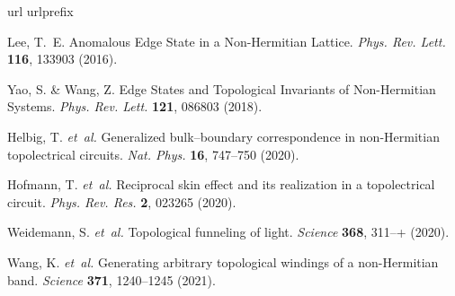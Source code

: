 \begin{thebibliography}{10}
\expandafter\ifx\csname url\endcsname\relax
  \def\url#1{\burl{#1}}\fi
\expandafter\ifx\csname urlprefix\endcsname\relax\def\urlprefix{URL }\fi
\providecommand{\bibinfo}[2]{#2}
\providecommand{\eprint}[2][]{\url{#2}}
\providecommand{\doi}[1]{\url{https://doi.org/#1}}
\bibcommenthead

\bibinfo{author}{Lee, T.~E.}
\newblock \bibinfo{title}{Anomalous {{Edge State}} in a {{Non-Hermitian Lattice}}}.
\newblock \emph{\bibinfo{journal}{Phys. Rev. Lett.}} \textbf{\bibinfo{volume}{116}}, \bibinfo{pages}{133903} (\bibinfo{year}{2016}).

\bibinfo{author}{Yao, S.} \& \bibinfo{author}{Wang, Z.}
\newblock \bibinfo{title}{Edge {{States}} and {{Topological Invariants}} of {{Non-Hermitian Systems}}}.
\newblock \emph{\bibinfo{journal}{Phys. Rev. Lett.}} \textbf{\bibinfo{volume}{121}}, \bibinfo{pages}{086803} (\bibinfo{year}{2018}).

\bibinfo{author}{Helbig, T.} \emph{et~al.}
\newblock \bibinfo{title}{Generalized bulk--boundary correspondence in non-{{Hermitian}} topolectrical circuits}.
\newblock \emph{\bibinfo{journal}{Nat. Phys.}} \textbf{\bibinfo{volume}{16}}, \bibinfo{pages}{747--750} (\bibinfo{year}{2020}).

\bibinfo{author}{Hofmann, T.} \emph{et~al.}
\newblock \bibinfo{title}{Reciprocal skin effect and its realization in a topolectrical circuit}.
\newblock \emph{\bibinfo{journal}{Phys. Rev. Res.}} \textbf{\bibinfo{volume}{2}}, \bibinfo{pages}{023265} (\bibinfo{year}{2020}).

\bibinfo{author}{Weidemann, S.} \emph{et~al.}
\newblock \bibinfo{title}{Topological funneling of light}.
\newblock \emph{\bibinfo{journal}{Science}} \textbf{\bibinfo{volume}{368}}, \bibinfo{pages}{311--+} (\bibinfo{year}{2020}).

\bibinfo{author}{Wang, K.} \emph{et~al.}
\newblock \bibinfo{title}{Generating arbitrary topological windings of a non-{{Hermitian}} band}.
\newblock \emph{\bibinfo{journal}{Science}} \textbf{\bibinfo{volume}{371}}, \bibinfo{pages}{1240--1245} (\bibinfo{year}{2021}).


\end{thebibliography}
